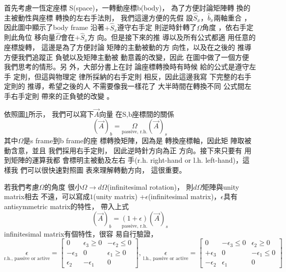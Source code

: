 \documentclass[12pt,twoside]{article}
\begin{document}
\begin{figure}[th]
\caption{{}}
\label{firstfig}
\begin{center}
\fbox{}
\end{center}
\end{figure}
\bigskip

首先考慮一恆定座標%
S(space)，一轉動座標b(body)，%
為了方便討論矩陣轉%
換的主被動性與座標%
轉換的左右手法則，%
我們這邊方便的先假%
設$\hat{S}_{x}， \hat{b}_{x}$兩軸重合%
，因此圖中顯示了body frame%
沿著$+\hat{S}_{x}$遵守右手定%
則逆時針轉了$\Omega $角度%
，依右手定則此角位%
移向量$\hat{\Omega}$會在$+\hat{S}_{x}$方%
向。但是接下來的推%
導以及所有公式都適%
用任意的座標旋轉，%
這邊是為了方便討論%
矩陣的主動被動的方%
向性，以及在之後的%
推導方便我們追蹤正%
負號以及矩陣主動被%
動意義的改變，因此%
在圖中做了一個方便%
我們思考的情形。另%
外，大部分書上在討%
論座標轉換時有時候%
給的公式是遵守左手%
定則，但這與物理定%
律所採納的右手定則%
相反，因此這邊我寫%
下完整的右手定則的%
推導，希望之後的人%
不需要像我一樣花了%
大半時間在轉換不同%
公式間左手右手定則%
帶來的正負號的改變%
。

\bigskip 依照圖\ref{firstfig}所示，%
我們可以寫下$\vec{A}$向量%
在S,b座標間的關係%
\begin{equation*}
\left( \vec{A}\right) _{b}=\underset{\text{passive, r.h.}}{\Omega }\left( 
\vec{A}\right) _{s}
\end{equation*}%
其中$\Omega $是s frame到b frame的座%
標轉換矩陣，因為是%
轉換座標軸，因此矩%
陣取被動含意，並且%
我們採用右手定則，%
因此逆時針方向為正%
方向。接下來只要有%
用到矩陣的運算我都%
會標明主被動及左右%
手(r.h. right-hand or l.h. left-hand)，這樣我%
們可以很快速對照圖%
表來理解轉動方向，%
這很重要。

若我們考慮$\Omega $的角度%
很小$\Omega \rightarrow d\Omega $(infinitesimal rotation)，%
則$d\Omega $矩陣與unity matrix相去%
不遠，可以寫成$1$(unity matrix) +$%
\epsilon $(infinitesimal matrix)，$\epsilon $具有%
antisymmetric matrix的特性\cite[p. 169]{goldstein}，%
帶入上式%
\begin{equation*}
\left( \vec{A}\right) _{b}=\underset{\text{passive, r.h.}}{\left( 1+\epsilon
\right) }\left( \vec{A}\right) _{s}
\end{equation*}%
infinitesimal matrix有個特性，很容%
易自行驗證，%
\begin{equation*}
\underset{\text{r.h., passive or active}}{\epsilon }=\left[ 
\begin{array}{ccc}
0 & \epsilon _{3}\geq 0 & -\epsilon _{2}\leq 0 \\ 
-\epsilon _{3} & 0 & \epsilon _{1}\geq 0 \\ 
\epsilon _{2} & -\epsilon _{1} & 0%
\end{array}%
\right] \text{, }\underset{\text{l.h., passive or active}}{\epsilon }=\left[ 
\begin{array}{ccc}
0 & -\epsilon _{3}\leq 0 & \epsilon _{2}\geq 0 \\ 
+\epsilon _{3} & 0 & -\epsilon _{1}\leq 0 \\ 
-\epsilon _{2} & \epsilon _{1} & 0%
\end{array}%
\right]
\end{equation*}
\end{document}
